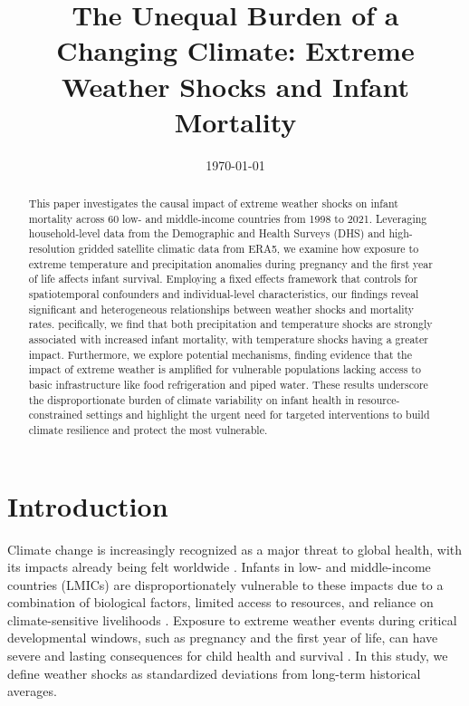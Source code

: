 \documentclass[a4paper]{article}
\title{The Unequal Burden of a Changing Climate: Extreme Weather Shocks and Infant Mortality}
\author{}
\date{\today}
\begin{document}
\maketitle

\begin{abstract}
This paper investigates the causal impact of extreme weather shocks on infant mortality across 60 low- and middle-income countries from 1998 to 2021. Leveraging household-level data from the Demographic and Health Surveys (DHS) and high-resolution gridded satellite climatic data from ERA5, we examine how exposure to extreme temperature and precipitation anomalies during pregnancy and the first year of life affects infant survival.  Employing a fixed effects framework that controls for spatiotemporal confounders and individual-level characteristics, our findings reveal significant and heterogeneous relationships between weather shocks and mortality rates. pecifically, we find that both precipitation and temperature shocks are strongly associated with increased infant mortality, with temperature shocks having a greater impact. Furthermore, we explore potential mechanisms, finding evidence that the impact of extreme weather is amplified for vulnerable populations lacking access to basic infrastructure like food refrigeration and piped water.  These results underscore the disproportionate burden of climate variability on infant health in resource-constrained settings and highlight the urgent need for targeted interventions to build climate resilience and protect the most vulnerable.
\end{abstract}

\newpage

\section{Introduction}

Climate change is increasingly recognized as a major threat to global health, with its impacts already being felt worldwide \cite{watts2018lancet}.  Infants in low- and middle-income countries (LMICs) are disproportionately vulnerable to these impacts due to a combination of biological factors, limited access to resources, and reliance on climate-sensitive livelihoods \cite{UNICEF2015}. Exposure to extreme weather events during critical developmental windows, such as pregnancy and the first year of life, can have severe and lasting consequences for child health and survival \cite{adger2006fair}.  In this study, we define weather shocks as standardized deviations from long-term historical averages.
\end{document}
